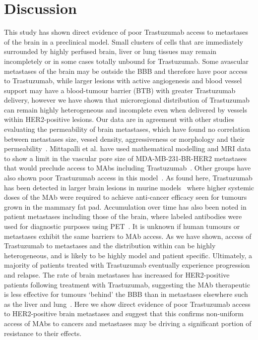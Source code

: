 \section{Discussion}

This study has shown direct evidence of poor Trastuzumab access to metastases of the brain in a preclinical model.
Small clusters of cells that are immediately surrounded by highly perfused brain, liver or lung tissues may remain incompletely or in some cases totally unbound for Trastuzumab.
Some avascular metastases of the brain may be outside the \acs{BBB} and therefore have poor access to Trastuzumab, while larger lesions with active angiogenesis and blood vessel support may have a blood-tumour barrier (BTB) with greater Trastuzumab delivery, however we have shown that microregional distribution of Trastuzumab can remain highly heterogeneous and incomplete even when delivered by vessels within \acs{HER2}-positive lesions.
Our data are in agreement with other studies evaluating the permeability of brain metastases, which have found no correlation between metastases size, vessel density, aggressiveness or morphology and their permeability~\cite{Murrell:2015bz,Adkins:2016il}.
Mittapalli et al. have used mathematical modelling and MRI data to show a limit in the vascular pore size of MDA-MB-231-BR-\acs{HER2} metastases that would preclude access to \acs{MAbs} including Trastuzumab~\cite{Mittapalli:2017iu}.
Other groups have also shown poor Trastuzumab access in this model~\cite{Nounou:2016kl,TerrellHall:2017gu}.
As found here, Trastuzumab has been detected in larger brain lesions in murine models~\cite{LewisPhillips:2017jj} where higher systemic doses of the \acs{MAb} were required to achieve anti-cancer efficacy seen for tumours grown in the mammary fat pad.
Accumulation over time has also been noted in patient metastases including those of the brain, where labeled antibodies were used for diagnostic purposes using PET~\cite{Dijkers:2010gc,Kurihara:2015kc}.
It is unknown if human tumours or metastases exhibit the same barriers to \acs{MAb} access.
As we have shown, access of Trastuzumab to metastases and the distribution within can be highly heterogeneous, and is likely to be highly model and patient specific.
Ultimately, a majority of patients treated with Trastuzumab eventually experience progression and relapse.
The rate of brain metastases has increased for \acs{HER2}-positive patients following treatment with Trastuzumab, suggesting the \acs{MAb} therapeutic is less effective for tumours `behind' the \acs{BBB} than in metastases elsewhere such as the liver and lung~\cite{Stemmler:2006}.
Here we show direct evidence of poor Trastuzumab access to \acs{HER2}-positive brain metastases and suggest that this confirms non-uniform access of \acs{MAbs} to cancers and metastases may be driving a significant portion of resistance to their effects.

